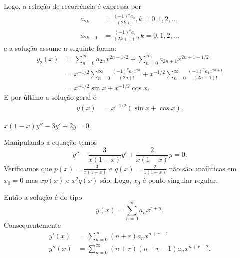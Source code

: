 \documentclass[a4paper,12pt, leqno, answers]{exam}
\begin{document}
\begin{questions}
\begin{solution}
        Logo, a rela\c{c}\~{a}o de recorr\^{e}ncia \'{e} expressa por
        \begin{align*}
            a_{2k} &= \frac{(-1)^k a_0}{(2k)!}, k = 0, 1, 2, \ldots \\
            a_{2k + 1} &= \frac{(-1)^k a_1}{(2k + 1)!}, k = 0, 1, 2, \ldots
        \end{align*}
        e a solu\c{c}\~{a}o assume a seguinte forma:
        \begin{align*}
            y_2(x) &= \sum_{n = 0}^\infty a_{2n} x^{2n - 1/2} + \sum_{n = 0}^\infty a_{2n + 1} x^{2n + 1 - 1/2} \\
            &= x^{-1/2} \sum_{n = 0}^\infty \frac{(-1)^k a_0 x^{2n}}{(2n)!} + x^{-1/2} \sum_{n = 0}^\infty \frac{(-1)^n a_1 x^{2n + 1}}{(2n + 1)!} \\
            &= x^{-1/2} \sin x + x^{-1/2} \cos x.
        \end{align*}
        E por \'{u}ltimo a solu\c{c}\~{a}o geral \'{e}
        \begin{align*}
            y(x) &= x^{-1/2} \left( \sin x + \cos x \right).
        \end{align*}
    \end{solution}

    \question $x\left( 1 - x \right) y'' - 3 y' + 2y = 0$.
    \begin{solution}
        Manipulando a equa\c{c}\~{a}o temos
        \[
        y'' - \frac{3}{x \left( 1 - x \right)} y' + \frac{2}{x \left( 1 - x \right)} y = 0.
        \]
        Verificamos que $p(x) = \frac{-3}{x \left( 1 - x \right)}$ e $q(x) = \frac{2}{1 \left( 1 - x \right)}$ n\~{a}o s\~{a}o ana\'{i}liticas em $x_0 = 0$ mas $x p(x)$ e $x^2 q(x)$ s\~{a}o. Logo, $x_0$ \'{e} ponto singular regular.

        Ent\~{a}o a solu\c{c}\~{a}o \'{e} do tipo
        \[
        y(x) = \sum_{n = 0}^\infty a_n x^{r + n}.
        \]
        Consequentemente
        \begin{align*}
            y'(x) &= \sum_{n = 0}^\infty \left( n + r \right) a_n x^{n + r - 1} \\
            y''(x) &= \sum_{n = 0}^\infty \left( n + r \right) \left( n + r - 1 \right) a_n x^{n + r - 2}.
        \end{align*}


\end{solution}
\end{questions}
\end{document}
